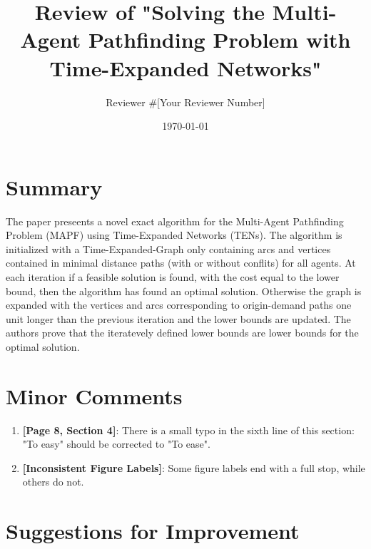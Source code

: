 \documentclass{article}
\begin{document}
\title{Review of "Solving the Multi-Agent Pathfinding Problem with Time-Expanded Networks"}
\author{Reviewer \#[Your Reviewer Number]}
\date{\today}

\maketitle

\section*{Summary}

The paper preseents a novel exact algorithm for the Multi-Agent Pathfinding Problem (MAPF) using Time-Expanded Networks (TENs).
The algorithm is initialized with a Time-Expanded-Graph only containing arcs and vertices contained in minimal distance paths (with or without conflits) for all agents.
At each iteration if a feasible solution is found, with the cost equal to the lower bound, then the algorithm has found an optimal solution. 
Otherwise the graph is expanded with the vertices and arcs corresponding to origin-demand paths one unit longer than the previous iteration and the lower bounds are updated.
The authors prove that the iteratevely defined lower bounds are lower bounds for the optimal solution.

\section*{Minor Comments}

\begin{enumerate}

    \item \textbf{[Page 8, Section 4]}: There is a small typo in the sixth line of this section: "To easy" should be corrected to "To ease".

    \item \textbf{[Inconsistent Figure Labels]}: Some figure labels end with a full stop, while others do not.

    
   
\end{enumerate}


\section*{Suggestions for Improvement}
\end{document}
